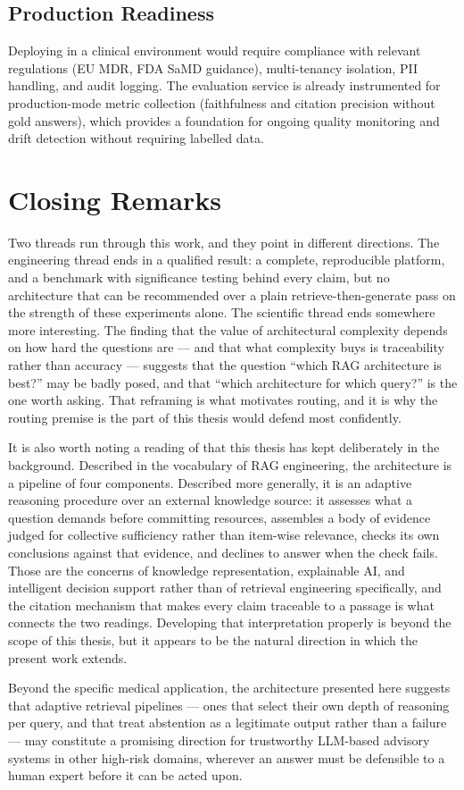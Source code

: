 \subsection{Production Readiness}
Deploying \medrag{} in a clinical environment would require compliance with
relevant regulations (EU MDR, FDA SaMD guidance), multi-tenancy isolation,
PII handling, and audit logging.
The evaluation service is already instrumented for production-mode metric
collection (faithfulness and citation precision without gold answers), which
provides a foundation for ongoing quality monitoring and drift detection
without requiring labelled data.

\section{Closing Remarks}
\label{sec:closing_remarks}

Two threads run through this work, and they point in different directions.
The engineering thread ends in a qualified result: a complete, reproducible
platform, and a benchmark with significance testing behind every claim, but no
architecture that can be recommended over a plain retrieve-then-generate pass on
the strength of these experiments alone.
The scientific thread ends somewhere more interesting.
The finding that the value of architectural complexity depends on how hard the
questions are --- and that what complexity buys is traceability rather than
accuracy --- suggests that the question ``which RAG architecture is best?'' may be
badly posed, and that ``which architecture for which query?'' is the one worth
asking.
That reframing is what motivates routing, and it is why the routing premise is the
part of \rarerag{} this thesis would defend most confidently.

It is also worth noting a reading of \rarerag{} that this thesis has kept
deliberately in the background.
Described in the vocabulary of RAG engineering, the architecture is a pipeline of
four components.
Described more generally, it is an adaptive reasoning procedure over an external
knowledge source: it assesses what a question demands before committing resources,
assembles a body of evidence judged for collective sufficiency rather than
item-wise relevance, checks its own conclusions against that evidence, and declines
to answer when the check fails.
Those are the concerns of knowledge representation, explainable AI, and intelligent
decision support rather than of retrieval engineering specifically, and the
citation mechanism that makes every claim traceable to a passage is what connects
the two readings.
Developing that interpretation properly is beyond the scope of this thesis, but it
appears to be the natural direction in which the present work extends.

Beyond the specific medical application, the architecture presented here suggests
that adaptive retrieval pipelines --- ones that select their own depth of reasoning
per query, and that treat abstention as a legitimate output rather than a failure
--- may constitute a promising direction for trustworthy LLM-based advisory systems
in other high-risk domains, wherever an answer must be defensible to a human expert
before it can be acted upon.
